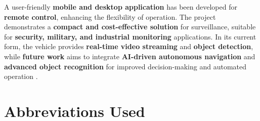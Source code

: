 \documentclass[12pt,a4paper]{report}
\begin{document}
A user-friendly \textbf{mobile and desktop application} has been developed for \textbf{remote control}, enhancing the flexibility of operation. The project demonstrates a \textbf{compact and cost-effective solution} for surveillance, suitable for \textbf{security, military, and industrial monitoring} applications. In its current form, the vehicle provides \textbf{real-time video streaming} and \textbf{object detection}, while \textbf{future work} aims to integrate \textbf{AI-driven autonomous navigation} and \textbf{advanced object recognition} for improved decision-making and automated operation \cite{homl}.






\cleardoublepage



		\tableofcontents

			\chapter*{\centering Abbreviations Used }
		\label{Abbreviations Used}
		
		
\end{document}
